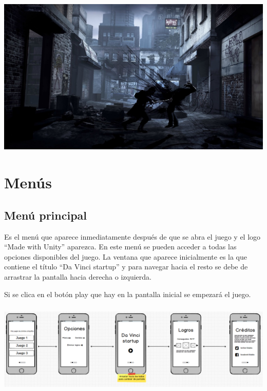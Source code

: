  \includegraphics[width=5.30458in,height=2.98414in]{anexos/GDD/GDD-img001.jpg} 

\section[Men\'us]{ Men\'us}
\label{guionTecnico}
\hypertarget{Toc484614215}{}\subsection[Men\'u principal]{ Men\'u principal}
\hypertarget{Toc484614216}{}{
Es el men\'u que aparece inmediatamente despu\'es de que se abra el juego y el logo ``Made with Unity'' aparezca. En
este men\'u se pueden acceder a todas las opciones disponibles del juego. La ventana que aparece inicialmente es la que
contiene el t\'itulo ``Da Vinci startup'' y para navegar hacia el resto se debe de arrastrar la pantalla hacia derecha
o izquierda.\ }

{
Si se clica en el bot\'on play que hay en la pantalla inicial se empezar\'a el juego.}


\bigskip

{
 \includegraphics[width=5.90556in,height=1.73542in]{anexos/GDD/GDD-img002.png} \foreignlanguage{spanish}{\ \ }}

